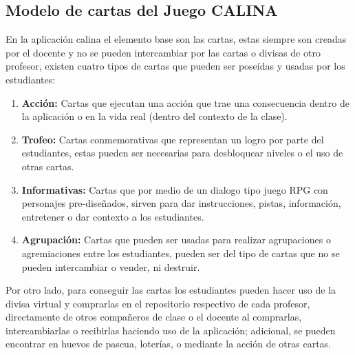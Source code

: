 \subsection{Modelo de cartas del Juego CALINA}

En la aplicación calina el elemento base son las cartas, estas siempre son creadas por el docente y no se 
pueden intercambiar por las cartas o divisas de otro profesor, existen cuatro tipos de cartas que pueden ser 
poseídas y usadas por los estudiantes:

\begin{enumerate}
\item \textbf{Acción:} Cartas que ejecutan una acción que trae una consecuencia dentro de la aplicación o en 
la vida real (dentro del contexto de la clase).
\item \textbf{Trofeo:} Cartas conmemorativas que representan un logro por parte del estudiantes, estas pueden
ser necesarias para desbloquear niveles o el uso de otras cartas.
\item \textbf{Informativas:} Cartas que por medio de un dialogo tipo juego RPG con personajes pre-diseñados, 
sirven para dar instrucciones, pistas, información, entretener o dar contexto a los estudiantes.
\item \textbf{Agrupación:} Cartas que pueden ser usadas para realizar agrupaciones o agremiaciones entre los 
estudiantes, pueden ser del tipo de cartas que no se pueden intercambiar o vender, ni destruir.
\end{enumerate}

Por otro lado, para conseguir las cartas los estudiantes pueden hacer uso de la divisa virtual y comprarlas en
el repositorio respectivo de cada profesor, directamente de otros compañeros de clase o el docente al 
comprarlas, intercambiarlas o recibirlas haciendo uso de la aplicación; adicional, se pueden encontrar en 
huevos de pascua, loterías, o mediante la acción de otras cartas.

